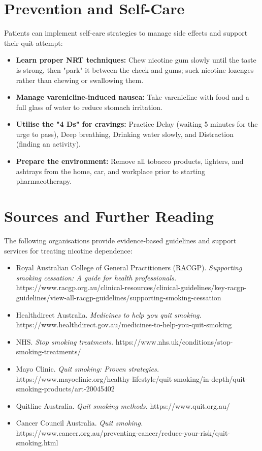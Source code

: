 \section*{Prevention and Self-Care}
Patients can implement self-care strategies to manage side effects and support their quit attempt:
\begin{itemize}
    \item \textbf{Learn proper NRT techniques:} Chew nicotine gum slowly until the taste is strong, then "park" it between the cheek and gums; suck nicotine lozenges rather than chewing or swallowing them.
    \item \textbf{Manage varenicline-induced nausea:} Take varenicline with food and a full glass of water to reduce stomach irritation.
    \item \textbf{Utilise the "4 Ds" for cravings:} Practice Delay (waiting 5 minutes for the urge to pass), Deep breathing, Drinking water slowly, and Distraction (finding an activity).
    \item \textbf{Prepare the environment:} Remove all tobacco products, lighters, and ashtrays from the home, car, and workplace prior to starting pharmacotherapy.
\end{itemize}

\section*{Sources and Further Reading}
The following organisations provide evidence-based guidelines and support services for treating nicotine dependence:
\begin{itemize}
    \item Royal Australian College of General Practitioners (RACGP). \textit{Supporting smoking cessation: A guide for health professionals.} https://www.racgp.org.au/clinical-resources/clinical-guidelines/key-racgp-guidelines/view-all-racgp-guidelines/supporting-smoking-cessation
    \item Healthdirect Australia. \textit{Medicines to help you quit smoking.} https://www.healthdirect.gov.au/medicines-to-help-you-quit-smoking
    \item NHS. \textit{Stop smoking treatments.} https://www.nhs.uk/conditions/stop-smoking-treatments/
    \item Mayo Clinic. \textit{Quit smoking: Proven strategies.} https://www.mayoclinic.org/healthy-lifestyle/quit-smoking/in-depth/quit-smoking-products/art-20045402
    \item Quitline Australia. \textit{Quit smoking methods.} https://www.quit.org.au/
    \item Cancer Council Australia. \textit{Quit smoking.} https://www.cancer.org.au/preventing-cancer/reduce-your-risk/quit-smoking.html
\end{itemize}
